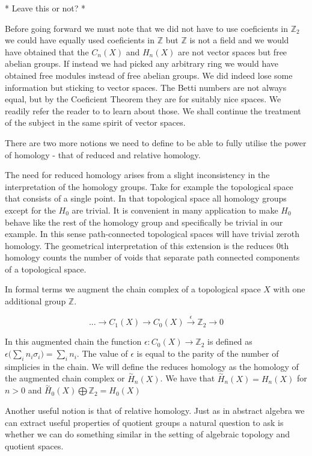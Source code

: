 * Leave this or not? *

Before going forward we must note that we did not have to use coeficients in $\mathbb{Z}_2$ we could have equally used coeficients in $\mathbb{Z}$ but $\mathbb{Z}$ is not a field and we would have obtained that the $C_n(X)$ and $H_n(X)$ are not vector spaces but free abelian groups. If instead we had picked any arbitrary ring we would have obtained free modules instead of free abelian groups. We did indeed lose some information but sticking to vector spaces. The Betti numbers are not always equal, but by the Coeficient Theorem they are for suitably nice spaces. We readily refer the reader to \cite{algebraic-topology} to learn about those. We shall continue the treatment of the subject in the same spirit of vector spaces.


There are two more notions we need to define to be able to fully utilise the power of homology - that of reduced and relative homology.

The need for reduced homology arises from a slight inconsistency in the interpretation of the homology groups. Take for example the topological space that consists of a single point. In that topological space all homology groups except for the $H_0$ are trivial. It is convenient in many application to make $H_0$ behave like the rest of the homology group and specifically be trivial in our example. In this sense path-connected topological spaces will have trivial zeroth homology. The geometrical interpretation of this extension is the reduces 0th homology counts the number of voids that separate path connected components of a topological space.

In formal terms we augment the chain complex of a topological space $X$ with one additional group $\mathbb{Z}$.

$$ ... \longrightarrow C_1(X) \longrightarrow C_0(X) \overset{\epsilon}{\longrightarrow} \mathbb{Z}_2 \longrightarrow 0 $$

In this augmented chain the function $\epsilon: C_0(X) \to \mathbb{Z}_2$ is defined as $\epsilon\big(\sum_{i}n_i\sigma_i\big) = \sum_{i}n_i$. The value of $\epsilon$ is equal to the parity of the number of simplicies in the chain. We will define the reduces homology as the homology of the augmented chain complex or $\overset{\sim}{H}_n(X)$. We have that $\overset{\sim}{H}_n(X) = H_n(X)$ for $n > 0$ and $\overset{\sim}{H}_0(X) \bigoplus \mathbb{Z}_2 = H_0(X) $

Another useful notion is that of relative homology. Just as in abstract algebra we can extract useful properties of quotient groups a natural question to ask is whether we can do something similar in the setting of algebraic topology and quotient spaces. 

